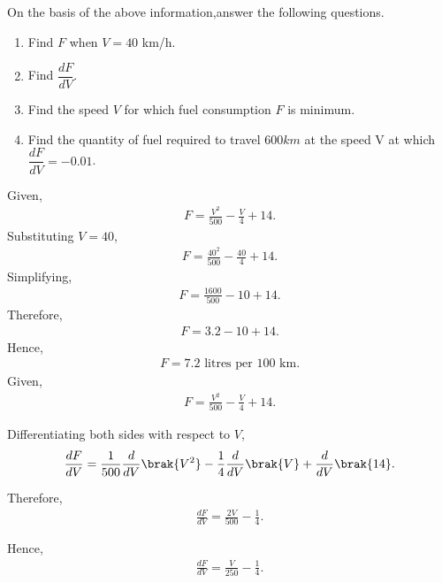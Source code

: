 \begin{enumerate}[label=\thesubsection.\arabic*, ref=\thesubsection.\theenumi]
On the basis of the above information,answer the following questions.
\begin{enumerate}

\item Find $F$ when $V=40$ km/h.
\item Find $\dfrac{dF}{dV}$.
\item {} Find the speed $V$ for which fuel consumption $F$ is minimum.
\item {} Find the quantity of fuel required to travel $600km$ at the speed V at which $\dfrac{dF}{dV} = -0.01$.

\end{enumerate}

\solution
{}
Given,
\begin{align}
F=\frac{V^2}{500}-\frac{V}{4}+14.
\end{align}
Substituting $V=40$,
\begin{align}
F=\frac{40^2}{500}-\frac{40}{4}+14.
\end{align}
Simplifying,
\begin{align}
F=\frac{1600}{500}-10+14.
\end{align}
Therefore,
\begin{align}
F=3.2-10+14.
\end{align}
Hence,
\begin{align}
F=7.2\text{ litres per }100\text{ km}.
\end{align}
Given,
\begin{align}
F=\frac{V^2}{500}-\frac{V}{4}+14.
\end{align}

Differentiating both sides with respect to $V$,
\begin{align}
\frac{dF}{dV}
=\frac{1}{500}\frac{d}{dV}\brak{V^2}
-\frac{1}{4}\frac{d}{dV}\brak{V}
+\frac{d}{dV}\brak{14}.
\end{align}

Therefore,
\begin{align}
\frac{dF}{dV}
=\frac{2V}{500}-\frac{1}{4}.
\end{align}

Hence,
\begin{align}
\frac{dF}{dV}=\frac{V}{250}-\frac{1}{4}.\label{eq:EE26BTECH11211-Prob_43.10}
\end{align}



\end{enumerate}
